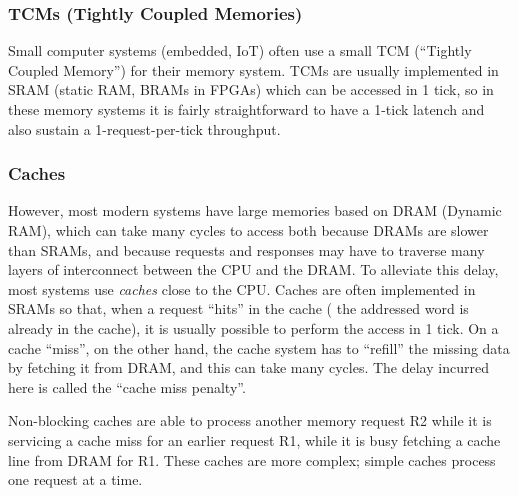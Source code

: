 
\subsubsection{TCMs (Tightly Coupled Memories)}




Small computer systems (embedded, IoT) often use a small TCM
(``Tightly Coupled Memory'') for their memory system.  TCMs are
usually implemented in SRAM (static RAM, BRAMs in FPGAs) which can be
accessed in 1 tick, so in these memory systems it is fairly
straightforward to have a 1-tick latench and also sustain a
1-request-per-tick throughput.


\subsubsection{Caches}



However, most modern systems have large memories based on DRAM
(Dynamic RAM), which can take many cycles to access both because DRAMs
are slower than SRAMs, and because requests and responses may have to
traverse many layers of interconnect between the CPU and the DRAM.  To
alleviate this delay, most systems use \emph{caches} close to the CPU.
Caches are often implemented in SRAMs so that, when a request ``hits''
in the cache ({\ie} the addressed word is already in the cache), it is
usually possible to perform the access in 1 tick.  On a cache
``miss'', on the other hand, the cache system has to ``refill'' the
missing data by fetching it from DRAM, and this can take many cycles.
The delay incurred here is called the ``cache miss penalty''.


Non-blocking caches are able to process another memory request R2
while it is servicing a cache miss for an earlier request R1, {\ie}
while it is busy fetching a cache line from DRAM for R1.  These caches
are more complex; simple caches process one request at a time.

